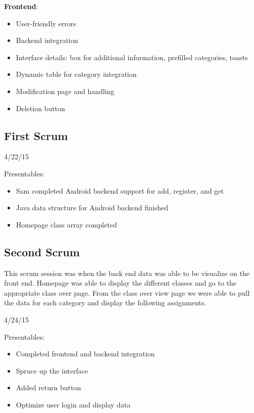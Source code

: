 \documentclass[a4paper]{article} %
\begin{document}
\textbf{Frontend}:
\begin{itemize}
  \item User-friendly errors
    \item Backend integration
    \item Interface details: box for additional information, prefilled categories, toasts
    \item Dynamic table for category integration
    \item Modification page and handling
    \item Deletion button
\end{itemize}

\subsection{First Scrum}

4/22/15

Presentables: 

\begin{itemize}
  \item Sam completed Android backend support for add, register, and get 
    \item Java data structure for Android backend finished
    \item Homepage class array completed
\end{itemize}

\subsection{Second Scrum}

This scrum session was when the back end data was able to be visualize on the front end. Homepage was able to display the different classes and go to the appropriate class over page. From the class over view page we were able to pull the data for each category and display the following assignments. 


4/24/15

Presentables: 

\begin{itemize}
  \item Completed frontend and backend integration
    \item Spruce up the interface
    \item Added return button
    \item Optimize user login and display data
\end{itemize}
\end{document}
